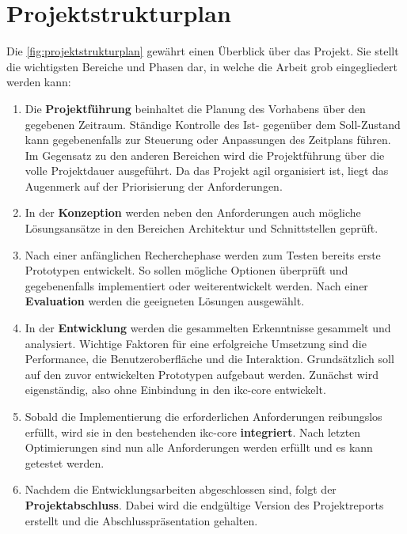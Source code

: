 \section{Projektstrukturplan}
Die \autoref{fig:projektstrukturplan} gewährt einen Überblick über das Projekt. Sie stellt die wichtigsten Bereiche und Phasen dar, in welche die Arbeit grob eingegliedert werden kann:
\begin{enumerate}
    \item Die \textbf{Projektführung} beinhaltet die Planung des Vorhabens über den gegebenen Zeitraum. Ständige Kontrolle des Ist- gegenüber dem Soll-Zustand kann gegebenenfalls zur Steuerung oder Anpassungen des Zeitplans führen. Im Gegensatz zu den anderen Bereichen wird die Projektführung über die volle Projektdauer ausgeführt. Da das Projekt agil organisiert ist, liegt das Augenmerk auf der Priorisierung der Anforderungen.
    \item In der \textbf{Konzeption} werden neben den Anforderungen auch mög\-li\-che Lös\-ungs\-an\-sätz\-e in den Bereichen Architektur und Schnittstellen geprüft.
    \item Nach einer anfänglichen Recherchephase werden zum Testen bereits erste Prototypen entwickelt. So sollen mögliche Optionen überprüft und gegebenenfalls implementiert oder weiterentwickelt werden. Nach einer \textbf{Evaluation} werden die geeigneten Lösungen ausgewählt.
    \item In der \textbf{Entwicklung} werden die gesammelten Erkenntnisse gesammelt und analysiert. Wichtige Faktoren für eine erfolgreiche Umsetzung sind die Performance, die Benutzeroberfläche und die Interaktion. Grundsätzlich soll auf den zuvor entwickelten Prototypen aufgebaut werden. Zunächst wird eigenständig, also ohne Einbindung in den \gls{ikc-core} entwickelt.
    \item Sobald die Implementierung die erforderlichen Anforderungen reibungslos erfüllt, wird sie in den bestehenden \gls{ikc-core} \textbf{integriert}. Nach letzten Optimierungen sind nun alle Anforderungen werden erfüllt und es kann getestet werden.
    \item Nachdem die Entwicklungsarbeiten abgeschlossen sind, folgt der \textbf{Projektabschluss}. Dabei wird die endgültige Version des Projektreports erstellt und die Abschlusspräsentation gehalten.
\end{enumerate}

